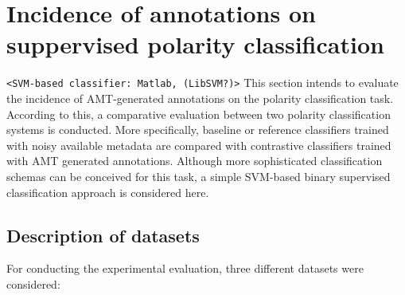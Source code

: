 \section{Incidence of annotations on suppervised polarity classification}
\label{sect:classifier}
\texttt{<SVM-based classifier: Matlab, (LibSVM?)>}
This section intends to evaluate the incidence of AMT-generated annotations on the polarity classification task.
According to this, a comparative evaluation between two polarity classification systems is conducted. 
More specifically, baseline or reference classifiers trained with noisy available metadata are compared with 
contrastive classifiers trained with AMT generated annotations.  
Although more sophisticated classification schemas can be conceived for this task, a simple SVM-based binary supervised classification approach is considered here.

\subsection{Description of datasets}
For conducting the experimental evaluation, three different datasets were considered:

